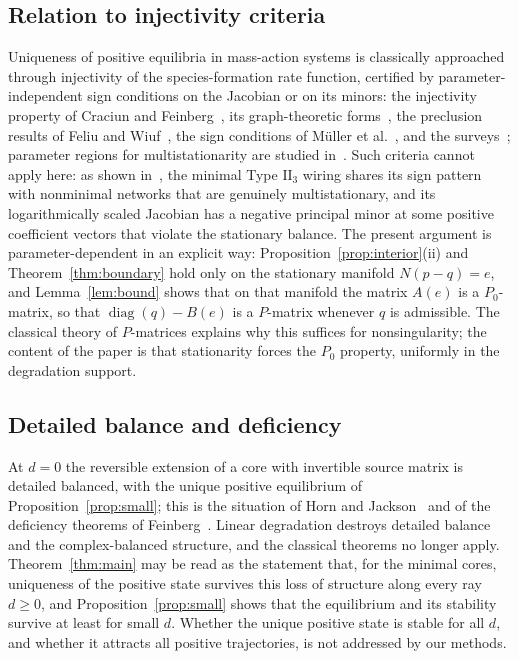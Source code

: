 \documentclass[11pt,a4paper]{article}
\theoremstyle{plain}
\theoremstyle{definition}
\theoremstyle{remark}
\numberwithin{equation}{section}
\newcommand{\diag}{\operatorname{diag}}
\newcommand{\II}{\mathrm{II}}
\begin{document}
\subsection*{Relation to injectivity criteria}
Uniqueness of positive equilibria in mass-action systems is classically approached through injectivity of the species-formation rate function, certified by parameter-independent sign conditions on the Jacobian or on its minors: the injectivity property of Craciun and Feinberg~\cite{CF05,CF06}, its graph-theoretic forms~\cite{BC10}, the preclusion results of Feliu and Wiuf~\cite{FW12}, the sign conditions of M\"uller et al.~\cite{MFRCSD16}, and the surveys~\cite{JS15,Fei19}; parameter regions for multistationarity are studied in~\cite{CFMW17}. Such criteria cannot apply here: as shown in~\cite{TypeIIpos}, the minimal Type $\II_3$ wiring shares its sign pattern with nonminimal networks that are genuinely multistationary, and its logarithmically scaled Jacobian has a negative principal minor at some positive coefficient vectors that violate the stationary balance. The present argument is parameter-dependent in an explicit way: Proposition~\ref{prop:interior}(ii) and Theorem~\ref{thm:boundary} hold only on the stationary manifold $N(p-q)=e$, and Lemma~\ref{lem:bound} shows that on that manifold the matrix $A(e)$ is a $P_0$-matrix, so that $\diag(q)-B(e)$ is a $P$-matrix whenever $q$ is admissible. The classical theory of $P$-matrices explains why this suffices for nonsingularity; the content of the paper is that stationarity forces the $P_0$ property, uniformly in the degradation support.

\subsection*{Detailed balance and deficiency}
At $d=0$ the reversible extension of a core with invertible source matrix is detailed balanced, with the unique positive equilibrium of Proposition~\ref{prop:small}; this is the situation of Horn and Jackson~\cite{HJ72} and of the deficiency theorems of Feinberg~\cite{Fei87,Fei19}. Linear degradation destroys detailed balance and the complex-balanced structure, and the classical theorems no longer apply. Theorem~\ref{thm:main} may be read as the statement that, for the minimal cores, uniqueness of the positive state survives this loss of structure along every ray $d\ge0$, and Proposition~\ref{prop:small} shows that the equilibrium and its stability survive at least for small $d$. Whether the unique positive state is stable for all $d$, and whether it attracts all positive trajectories, is not addressed by our methods.
\end{document}

